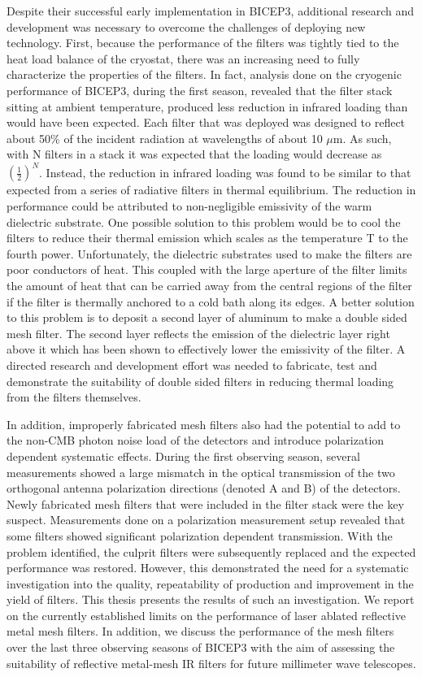 \documentclass[12pt]{article}
\begin{document}
Despite their successful early implementation in BICEP3, additional research and development was necessary to overcome the challenges of deploying new technology. First, because the performance of the filters was tightly tied to the heat load balance of the cryostat, there was an increasing need to fully characterize the properties of the filters. In fact, analysis done on the cryogenic performance of BICEP3, during the first season, revealed that the filter stack sitting at ambient temperature, produced less reduction in infrared loading than would have been expected. Each filter that was deployed was designed to reflect about 50\% of the incident radiation at wavelengths of about 10 $\mu$m. As such, with N filters in a stack it was expected that the loading would decrease as $\left(\frac{1}{2}\right)^N$. Instead, the reduction in infrared loading was found to be similar to that expected from a series of radiative filters in thermal equilibrium. The reduction in performance could be attributed to non-negligible emissivity of the warm dielectric substrate. One possible solution to this problem would be to cool the filters to reduce their thermal emission which scales as the temperature T to the fourth power. Unfortunately, the dielectric substrates used to make the filters are poor conductors of heat. This coupled with the large aperture of the filter limits the amount of heat that can be carried away from the central regions of the filter if the filter is thermally anchored to a cold bath along its edges. A better solution to this problem is to deposit a second layer of aluminum to make a double sided mesh filter. The second layer reflects the emission of the dielectric layer right above it which has been shown to effectively lower the emissivity of the filter. A directed research and development effort was needed to fabricate, test and demonstrate the suitability of double sided filters in reducing thermal loading from the filters themselves. 

In addition, improperly fabricated mesh filters also had the potential to add to the non-CMB photon noise load of the detectors and introduce polarization dependent systematic effects. During the first observing season, several measurements showed a large mismatch in the optical transmission of the two orthogonal antenna polarization directions (denoted A and B) of the detectors. Newly fabricated mesh filters that were included in the filter stack were the key suspect. Measurements done on a polarization measurement setup revealed that some filters showed significant polarization dependent transmission. With the problem identified, the culprit filters were subsequently replaced and the expected performance was restored. However, this demonstrated the need for a systematic investigation into the quality, repeatability of production and improvement in the yield of filters. This thesis presents the results of such an investigation. We report on the currently established limits on the performance of laser ablated reflective metal mesh filters. In addition, we discuss the performance of the mesh filters over the last three observing seasons of BICEP3 with the aim of assessing the suitability of reflective metal-mesh IR filters for future millimeter wave telescopes.
\end{document}
